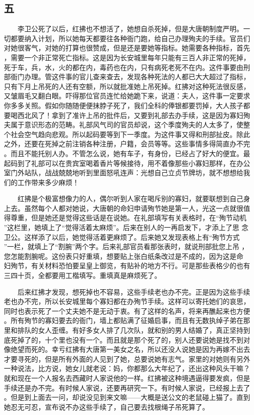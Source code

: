  
\subsection{五} 
 
 　　李卫公死了以后，红拂也不想活了，她想自杀死掉，但是大唐朝制度严明。一 切都要纳入计划，所以她每天都要往各种衙门跑，给自己办理殉夫的手续。官员们 对她很客气，对她的打算也很赞成，但是还是要她等指标。她需要各种指标，首先 ，需要一个非正常死亡指标。这是因为长安城里每年只能有三百人非正常的死掉， 死于车，兵，水，火的都在内，毒药也在内，只有病死老死不在内。这件事要由刑 部衙门办理。管这件事的官儿查来查去，发现各种死法的人都已大大超过了指标， 只有下月上吊死的人还有空额，所以就批准她上吊死掉。红拂对这种死法很反感， 又皱眉毛又翻白眼。吓得那位官员连忙给她跪下来，说道：夫人，这件事一定要求 你多多关照。假如你随随便便抹脖子死了，我们全科的俸银都要罚掉，大人孩子都 要喝西北风了！拿到了准许上吊的批件后，又要到礼部去办手续，这是因为寡妇殉 夫属于意识形态的范畴。礼部风气司的官员却说，这个季度殉夫的人太多了，使整 个社会空气趋向悲观。所以起码要等到下一季度。为这件事又得和刑部扯皮。除此 之外，还要在死掉之前注销各种注册，户籍，会员等等。这些事情多得简直办不完 。而且不能托别人办。不管怎么说，她有车子，有身份，已经占了好大的便宜。最 起码到了礼部可以在贵宾室喝着香片等候接待，用不着像那些小寡妇那样，在办公 室门外站队，战战兢兢地听到里面怒吼连声：光想自己立贞节牌坊，就不想想给我 们的工作带来多少麻烦！ 

　　红拂是个极富想像力的人，偶尔听到人家在喝斥别的寡妇，就要联想到自己身 上去。虽然每个人都对她说，大唐朝的命妇申请殉节她是第一人，光这一点就很值 得尊重，但是她还是觉得这些话是在说她。在礼部填写有关表格时，在“殉节动机 ”这栏里，她填上了“觉得活着太麻烦”。后来在别人的一再启发下，才添上了思 念卫公。这样添了以后，她觉得活着更麻烦了。后来她又发现表格上有“殉节方式 ”一栏，就填上了“割腕”两个字。后来礼部官员看那张表时，就说刑部批您上吊 ，您怎能割腕呢。这份表只好重填，想要贴上张白纸条改过是不成的，因为这是命 妇殉节，有关材料恐怕要呈皇上御览，有贴补的地方不行。可是那些表格少的也有 三四十页，全都要用工楷填写。重填真是麻烦死了。

 　　后来红拂才发现，想死掉也不容易，这些手续老也办不完。正是因为这些手续 老也办不完，所以长安城里每个寡妇都在办殉节手续。这样可以寄托她们的哀思， 同时也表示死了一个丈夫她不是无动于衷。有了这样的名声，将来再醮起来也方便 。所有殉节的寡妇要去的衙门，墙上都贴满了征婚启事，而且有无数执绰子弟在那 里和排队的女人歪缠。有好多女人排了几次队，就和别的男人结婚了，真正坚持到 底死掉了的，十个里也没有一个。而且就是那个死了的，别人还要说她是找不到对 像绝望而死的。幸亏红拂有大唐第一美女之名，所以还没人说她是因为再嫁不出去 才要寻死的，但是所有外面的人见到了她，总要说她有志气。家里的对她则有另外 一种说法，比方说，她女儿就老说：妈，你都那么大年纪了，还出这种风头干嘛？ 就和现在一个人报名去西藏时人家说他的一样。红拂被这种境遇逼得要发疯，但是 手续还是办不完。有时候人家说，还要再研究一下。有时候人家说，已经报上去了 。但是到上面去一问，却说没见到来文嘛——大概是送公文的老鼠碰上猫了。直到 她忍无可忍，宣布说不办这些手续了，自己要去找根绳子吊死算了。

